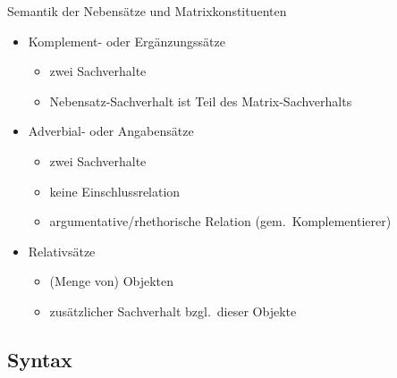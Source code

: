 \begin{frame}
  {Semantik der Nebensätze und Matrixkonstituenten}
  \pause
  \begin{exe}
    \pause
    \pause
  \end{exe}
  \pause
  \Halbzeile
  \begin{itemize}[<+->]
    \item Komplement- oder Ergänzungssätze
      \begin{itemize}[<+->]
        \item zwei Sachverhalte
        \item Nebensatz-Sachverhalt ist \alert{Teil des Matrix-Sachverhalts}
      \end{itemize}
    \item Adverbial- oder Angabensätze
      \begin{itemize}[<+->]
        \item zwei Sachverhalte
        \item keine Einschlussrelation
        \item \alert{argumentative\slash rhethorische Relation} (gem.\ Komplementierer)
      \end{itemize}
    \item Relativsätze
      \begin{itemize}[<+->]
        \item (Menge von) Objekten
        \item \alert{zusätzlicher Sachverhalt bzgl.\ dieser Objekte}
      \end{itemize}
  \end{itemize}
\end{frame}

\subsection{Syntax}

